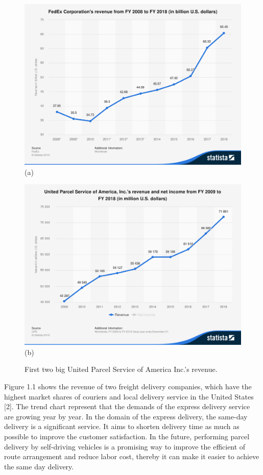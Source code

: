 \documentclass[12pt]{ksthesis}
\begin{document}
\begin{thesis}
{\begin{figure}
\footnotesize
\begin{minipage}[t]{0.48\linewidth}
    \centering
    \includegraphics*[width=\linewidth]{./figures/F1-a.PNG}
    (a)
\end{minipage}
\begin{minipage}[t]{0.48\linewidth}
    \centering
    \includegraphics*[width=\linewidth]{./figures/F1-b.PNG}
    (b)
\end{minipage}
\normalsize
\caption{First two big United Parcel Service of America Inc.'s revenue.}
\label{fig:UnitedParcelService}
\end{figure} 

Figure 1.1 shows the revenue of two freight delivery companies, which have the highest market shares of couriers and local delivery service in the United States [2]. The trend chart represent that the demands of the express delivery service are growing year by year. In the domain of the express delivery, the same-day delivery is a significant service. It aims to shorten delivery time as much as possible to improve the customer satisfaction. In the future, performing parcel delivery by self-driving vehicles is a promising way to improve the efficient of route arrangement and reduce labor cost, thereby it can make it easier to achieve the same day delivery.

}
\end{thesis}
\end{document}
